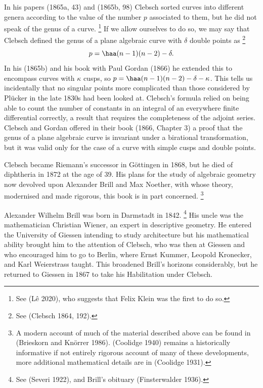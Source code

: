 In his papers (1865a, 43) and (1865b, 98) Clebsch sorted curves into
%
different genera according to the value of the number $p$ associated
to them, but he did not speak of the genus of a curve.%
%
\footnote{See
(L\^e 2020), who suggests that Felix Klein
%
was the first to do so.} 
%
If
we allow ourselves to do so, we may say that Clebsch defined the genus
of a plane algebraic curve with $\delta$ double points as%
%
\footnote{See (Clebsch 1864, 192).}
%
$$p = \haa (n-1)(n-2) - \delta.$$
In his (1865b) and his book with Paul Gordan
%
(1866) he extended this to
encompass curves with
$\kappa$ cusps,
%
 so $p= \haa (n-1)(n-2) - \delta - \kappa$. This tells
us incidentally that no singular points more complicated than those
considered by Pl\"ucker in the late 1830s had been looked at. Clebsch's
%
formula relied on being able to count the number of constants in an
integral of an everywhere finite differential correctly, a result that
requires the  completeness of the adjoint series. Clebsch and Gordan offered
in their book (1866, Chapter 3) a proof that the genus of a plane
algebraic curve is invariant under a birational transformation,
%
 but it was
valid only for the case of a curve with simple cusps and double points.
%
%

Clebsch became   Riemann's successor in G\"ottingen
%
in 1868, but  he
died of diphtheria in 1872 at the age of 39. His plans for the study of
algebraic geometry now devolved upon Alexander Brill
%
and Max Noether,
%
with whose theory, modernised and made rigorous,  this book is in part
concerned.%
%
\footnote{A modern account of  much of the material described
above can be found in (Brieskorn and Kn\"orrer 1986). (Coolidge 1940)
remains a historically informative if not entirely rigorous account of
many of these developments, more additional mathematical details are in
(Coolidge 1931).}

Alexander Wilhelm Brill was born in Darmstadt in 1842.%
%
\footnote{See
(Severi 1922),  and Brill's obituary (Finsterwalder 1936).}
%
His  uncle was
the mathematician Christian Wiener,
%
 an expert in descriptive geometry.
%
 He
entered the University of Giessen
%
intending to study architecture but his
mathematical ability brought him to the attention of Clebsch, who was then
at Giessen and who encouraged him to go  to Berlin, where  Ernst
Kummer,
%
Leopold Kronecker,
%
 and Karl Weierstrass
%
taught. This broadened Brill's
horizons considerably, but he returned to Giessen in 1867 to take his
%
Habilitation  under Clebsch.

